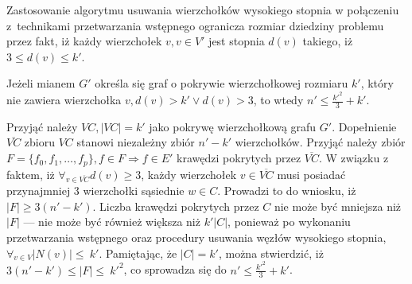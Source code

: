 Zastosowanie algorytmu usuwania wierzchołków wysokiego stopnia w połączeniu 
z~technikami przetwarzania wstępnego ogranicza rozmiar dziedziny problemu przez
fakt, iż każdy wierzchołek $v, v \in V\prime$ jest stopnia $d(v)$ takiego, iż
$3 \leq d(v) \leq k\prime$.

\begin{theorem}
  Jeżeli mianem $G\prime$ określa się graf o pokrywie wierzchołkowej rozmiaru
  $k\prime$, który nie zawiera wierzchołka $v, d(v) > k\prime \lor d(v) > 3$, to
  wtedy $n\prime \leq \frac{k\prime^2}{3} + k\prime$.
\end{theorem}
\begin{bproof}
  Przyjąć należy ${VC,|VC|=k\prime}$ jako pokrywę wierzchołkową grafu
  $G\prime$.
  Dopełnienie $\overline{VC}$ zbioru $VC$ stanowi niezależny zbiór
  $n\prime-k\prime$ wierzchołków.
  Przyjąć należy zbiór $F=\{f_0,f_1, \ldots, f_p\}, f \in F \Rightarrow f \in E\prime$
  krawędzi pokrytych przez $\overline{VC}$.
  W związku z faktem, iż $\forall_{v \in \overline{VC}}{d(v) \geq 3}$, każdy
  wierzchołek $v \in \overline{VC}$ musi posiadać przynajmniej 3 wierzchołki sąsiednie
  $w \in C$.
  Prowadzi to do wniosku, iż $|F| \geq 3(n\prime - k\prime)$.
  Liczba krawędzi pokrytych przez $C$ nie może być mniejsza niż $|F|$ --- nie
  może być również większa niż $k\prime|C|$, ponieważ po wykonaniu
  przetwarzania wstępnego oraz procedury usuwania węzłów wysokiego stopnia,
  $\forall_{v \in V}{|N(v)|\leq~k\prime}$.
  Pamiętając, że $|C|=k\prime$, można stwierdzić, iż
  ${3(n\prime-k\prime)\leq|F|\leq~k\prime^2}$, co sprowadza się do
  ${n\prime\leq\frac{k\prime^2}{3}+k\prime}$.
\end{bproof}


